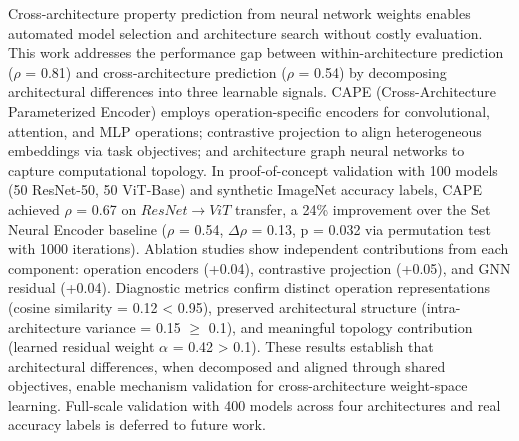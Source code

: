 
Cross-architecture property prediction from neural network weights enables automated model selection and architecture search without costly evaluation. This work addresses the performance gap between within-architecture prediction ($\rho$ = 0.81) and cross-architecture prediction ($\rho$ = 0.54) by decomposing architectural differences into three learnable signals. CAPE (Cross-Architecture Parameterized Encoder) employs operation-specific encoders for convolutional, attention, and MLP operations; contrastive projection to align heterogeneous embeddings via task objectives; and architecture graph neural networks to capture computational topology. In proof-of-concept validation with 100 models (50 ResNet-50, 50 ViT-Base) and synthetic ImageNet accuracy labels, CAPE achieved $\rho$ = 0.67 on $ResNet\rightarrow ViT$ transfer, a 24\% improvement over the Set Neural Encoder baseline ($\rho$ = 0.54, $\Delta\rho$ = 0.13, p = 0.032 via permutation test with 1000 iterations). Ablation studies show independent contributions from each component: operation encoders (+0.04), contrastive projection (+0.05), and GNN residual (+0.04). Diagnostic metrics confirm distinct operation representations (cosine similarity = 0.12 < 0.95), preserved architectural structure (intra-architecture variance = 0.15 $\geq$ 0.1), and meaningful topology contribution (learned residual weight $\alpha$ = 0.42 > 0.1). These results establish that architectural differences, when decomposed and aligned through shared objectives, enable mechanism validation for cross-architecture weight-space learning. Full-scale validation with 400 models across four architectures and real accuracy labels is deferred to future work.
